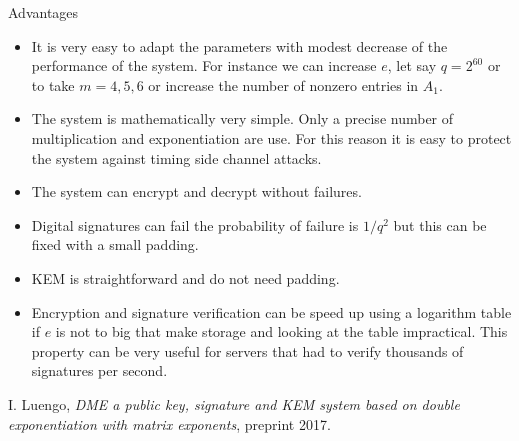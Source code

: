 \documentclass[12pt,a4paper]{amsart}
\theoremstyle{remark}
\theoremstyle{definition}
\begin{document}
{Advantages}
\begin{itemize}
 \item It is very easy to adapt the parameters with modest decrease of the performance of the system. For instance we can increase $e$, let say 
 $q=2^{60}$ or to take $m=4,5,6$ or increase the number of nonzero entries in $A_1$.
 \item The system is mathematically very simple. Only a precise number of multiplication and exponentiation are use.  For this reason it is
 easy to protect the system against timing side channel attacks.
 \item The system can encrypt and decrypt 
 without failures. 
  \item Digital signatures can fail the probability of failure is $1/q^2$ but this can be fixed with a small padding.
 \item KEM is straightforward and do not need padding.
 \item Encryption and signature verification can be speed up using a logarithm table if $e$ is not to big that make storage   
 and looking at the table impractical. This property can be very useful for servers that had to verify thousands of signatures per second. 
\end{itemize}





\begin{thebibliography}{15}
 
  I. Luengo, \emph{DME a  public key, signature and KEM system based on double exponentiation  with matrix exponents}, preprint 2017.

\end{thebibliography}
\end{document}
